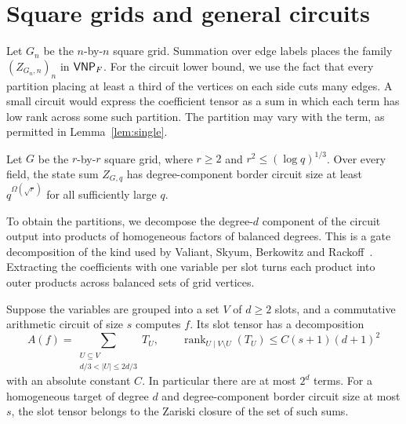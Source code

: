 \section{Square grids and general circuits}\label{sec:grid}

Let $G_n$ be the $n$-by-$n$ square grid. Summation over edge labels
places the family $(Z_{G_n,n})_n$ in $\mathsf{VNP}_F$. For the circuit lower
bound, we use the fact that every partition
placing at least a third of the vertices on each side cuts many edges.
A small circuit would express the coefficient tensor as a sum in which
each term has low rank across some such partition. The partition may
vary with the term, as permitted in Lemma~\ref{lem:single}.

\begin{theorem}\label{thm:grid}
Let $G$ be the $r$-by-$r$ square grid, where
$r\ge2$ and $r^2\le(\log q)^{1/3}$. Over every field, the state sum
$Z_{G,q}$ has degree-component border circuit size at least
$q^{\Omega(\sqrt r)}$ for all sufficiently large $q$.
\end{theorem}

To obtain the partitions, we decompose the degree-$d$ component of
the circuit output into products of homogeneous factors of balanced
degrees. This is a gate decomposition of the kind used by Valiant,
Skyum, Berkowitz and Rackoff~\cite{VSBR}. Extracting the coefficients with one variable per slot turns each
product into outer products across balanced sets of grid vertices.

\begin{lemma}\label{lem:balanced}
Suppose the variables are grouped into a set $V$ of $d\ge2$ slots, and
a commutative arithmetic circuit of size $s$ computes $f$. Its slot
tensor has a decomposition
\[
 A(f)=\sum_{\substack{U\subseteq V\\d/3<|U|\le 2d/3}}T_U ,
 \qquad
 \operatorname{rank}_{U\mid V\setminus U}(T_U)
 \le C(s+1)(d+1)^2
\]
with an absolute constant $C$. In particular there are at most $2^d$
terms. For a homogeneous target of degree $d$ and degree-component
border circuit size at most $s$, the slot tensor belongs to the
Zariski closure of the set of such sums.
\end{lemma}

